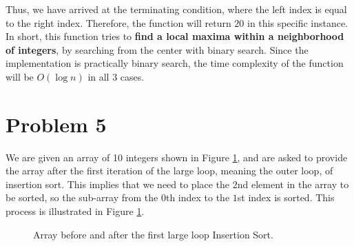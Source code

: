 \documentclass{report}
\begin{document}
Thus, we have arrived at the terminating condition, where the left index is equal to the right index. Therefore, the function will return $\boxed{20}$ in this specific instance. In short, this function tries to \textbf{find a local maxima within a neighborhood of integers}, by searching from the center with binary search. Since the implementation is practically binary search, the time complexity of the function will be $O(\log n)$ in all 3 cases.

\section{Problem 5}
We are given an array of 10 integers shown in Figure \ref{p5}, and are asked to provide the array after the first iteration of the large loop, meaning the outer loop, of insertion sort. This implies that we need to place the $2$nd element in the array to be sorted, so the sub-array from the $0$th index to the $1$st index is sorted. This process is illustrated in Figure \ref{p5}.
\begin{figure}[h]
	\centering
	\caption{Array before and after the first large loop Insertion Sort.}
	\label{p5}
\end{figure}
\end{document}
